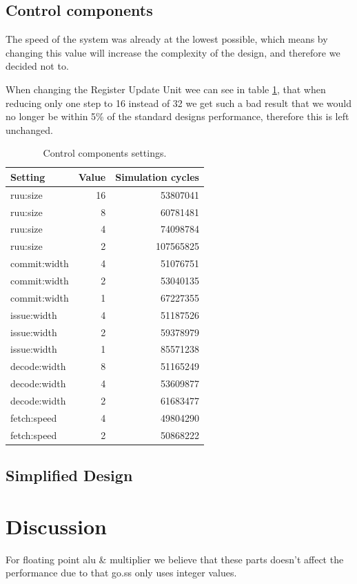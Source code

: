 \documentclass[titlepage, a4paper]{article}
\begin{document}
\subsection{Control components}
The speed of the system was already at the lowest possible, which means by changing this value will increase the complexity of the design, and therefore we decided not to.

When changing the Register Update Unit wee can see in table \ref{tab:control}, that when reducing only one step to 16 instead of 32 we get such a bad result that we would no longer be within 5\% of the standard designs performance, therefore this is left unchanged.

\begin{table}[H]
\centering
\caption{Control components settings.}

\begin{tabular}{|l|r|r|}
  \hline
  \textbf{Setting} & \textbf{Value} & \textbf{Simulation cycles}\\ \hline
  ruu:size & 16 & 53807041 \\ \hline
  ruu:size & 8 & 60781481 \\ \hline
  ruu:size & 4 & 74098784 \\ \hline
  ruu:size & 2 & 107565825 \\ \hline
  commit:width & 4 & 51076751 \\ \hline
  commit:width & 2 & 53040135 \\ \hline
  commit:width & 1 & 67227355 \\ \hline
  issue:width & 4 & 51187526 \\ \hline
  issue:width & 2 & 59378979 \\ \hline
  issue:width & 1 & 85571238 \\ \hline
  decode:width & 8 & 51165249 \\ \hline
  decode:width & 4 & 53609877 \\ \hline
  decode:width & 2 & 61683477 \\ \hline
  fetch:speed & 4 & 49804290 \\ \hline
  fetch:speed & 2 & 50868222 \\ \hline
\end{tabular}

\label{tab:control}
\end{table}

\subsection{Simplified Design}

\section{Discussion}
For floating point alu \& multiplier we believe that these parts doesn't affect the performance due to that go.ss only uses integer values.
\end{document}
